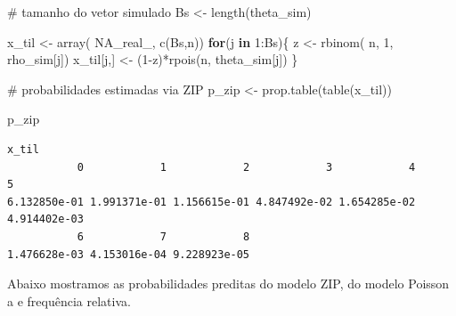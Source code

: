 \documentclass[
  letterpaper,
  DIV=11,
  numbers=noendperiod]{scrreprt}
\newenvironment{Shaded}{\begin{snugshade}}{\end{snugshade}}
\newcommand{\CommentTok}[1]{\textcolor[rgb]{0.37,0.37,0.37}{#1}}
\newcommand{\ConstantTok}[1]{\textcolor[rgb]{0.56,0.35,0.01}{#1}}
\newcommand{\ControlFlowTok}[1]{\textcolor[rgb]{0.00,0.23,0.31}{\textbf{#1}}}
\newcommand{\DecValTok}[1]{\textcolor[rgb]{0.68,0.00,0.00}{#1}}
\newcommand{\FunctionTok}[1]{\textcolor[rgb]{0.28,0.35,0.67}{#1}}
\newcommand{\NormalTok}[1]{\textcolor[rgb]{0.00,0.23,0.31}{#1}}
\newcommand{\OtherTok}[1]{\textcolor[rgb]{0.00,0.23,0.31}{#1}}
\newcommand{\SpecialCharTok}[1]{\textcolor[rgb]{0.37,0.37,0.37}{#1}}
\theoremstyle{plain}
\theoremstyle{definition}
\theoremstyle{definition}
\theoremstyle{remark}
\begin{document}
\begin{Shaded}
\begin{Highlighting}[]
\CommentTok{\# tamanho do vetor simulado}
\NormalTok{Bs }\OtherTok{\textless{}{-}} \FunctionTok{length}\NormalTok{(theta\_sim)}

\NormalTok{x\_til }\OtherTok{\textless{}{-}} \FunctionTok{array}\NormalTok{( }\ConstantTok{NA\_real\_}\NormalTok{, }\FunctionTok{c}\NormalTok{(Bs,n))}
\ControlFlowTok{for}\NormalTok{(j }\ControlFlowTok{in} \DecValTok{1}\SpecialCharTok{:}\NormalTok{Bs)\{}
\NormalTok{  z }\OtherTok{\textless{}{-}} \FunctionTok{rbinom}\NormalTok{( n, }\DecValTok{1}\NormalTok{, rho\_sim[j])}
\NormalTok{  x\_til[j,] }\OtherTok{\textless{}{-}}\NormalTok{ (}\DecValTok{1}\SpecialCharTok{{-}}\NormalTok{z)}\SpecialCharTok{*}\FunctionTok{rpois}\NormalTok{(n, theta\_sim[j])}
\NormalTok{\}}

\CommentTok{\# probabilidades estimadas via ZIP}
\NormalTok{p\_zip }\OtherTok{\textless{}{-}} \FunctionTok{prop.table}\NormalTok{(}\FunctionTok{table}\NormalTok{(x\_til))}

\NormalTok{p\_zip}
\end{Highlighting}
\end{Shaded}

\begin{verbatim}
x_til
           0            1            2            3            4            5 
6.132850e-01 1.991371e-01 1.156615e-01 4.847492e-02 1.654285e-02 4.914402e-03 
           6            7            8 
1.476628e-03 4.153016e-04 9.228923e-05 
\end{verbatim}

Abaixo mostramos as probabilidades preditas do modelo ZIP, do modelo
Poisson a e frequência relativa.
\end{document}
